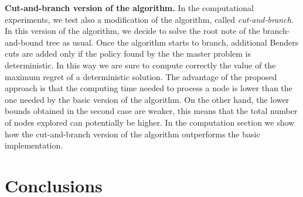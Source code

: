 \documentclass[sigconf]{aamas}  %
\begin{document}
\textbf{Cut-and-branch version of the algorithm.}  %
In the computational experiments, we test also a modification of the algorithm, called \textit{cut-and-branch}. In this version of the algorithm, we decide to solve the root note of the branch-and-bound tree as usual. %
Once the algorithm starts to branch, additional Benders cuts are added only if the policy found by the the master problem is deterministic. In this way we are sure to compute correctly the value of the maximum regret of a deterministic solution. The advantage of the proposed approach is that the computing time needed to process a node is lower than the one needed by the basic version of the algorithm. On the other hand, the lower bounds obtained in the second case are weaker, this means that the total number of nodes explored can potentially be higher.
In the computation section we show how the cut-and-branch version of the algorithm outperforms the basic implementation.    









\section{Conclusions}
		







\end{document}
